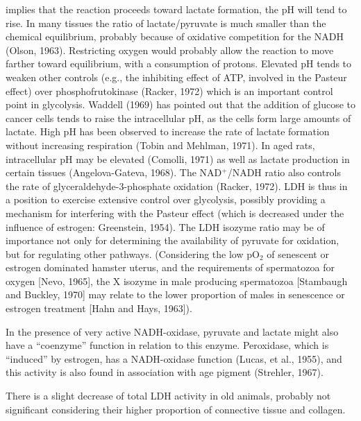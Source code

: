 \noindent implies that the reaction proceeds toward lactate formation, the pH will tend to rise. In many tissues the ratio of lactate/pyruvate is much smaller than the chemical equilibrium, probably because of oxidative competition for the NADH (Olson, 1963). Restricting oxygen would probably allow the reaction to move farther toward equilibrium, with a consumption of protons. Elevated pH tends to weaken other controls (e.g., the inhibiting effect of ATP, involved in the Pasteur effect) over phosphofrutokinase (Racker, 1972) which is an important control point in glycolysis. Waddell (1969) has pointed out that the addition of glucose to cancer cells tends to raise the intracellular pH, as the cells form large amounts of lactate. High pH has been observed to increase the rate of lactate formation without increasing respiration (Tobin and Mehlman, 1971). In aged rats, intracellular pH may be elevated (Comolli, 1971) as well as lactate production in certain tissues (Angelova-Gateva, 1968). The NAD$^{+}$/NADH ratio also controls the rate of glyceraldehyde-3-phosphate oxidation (Racker, 1972). LDH is thus in a position to exercise extensive control over glycolysis, possibly providing a mechanism for interfering with the Pasteur effect (which is decreased under the influence of estrogen: Greenstein, 1954). The LDH isozyme ratio may be of importance not only for determining the availability of pyruvate for oxidation, but for regulating other pathways. (Considering the low pO$_{2}$ of senescent or estrogen dominated hamster uterus, and the requirements of spermatozoa for oxygen [Nevo, 1965], the X isozyme in male producing spermatozoa [Stambaugh and Buckley, 1970] may relate to the lower proportion of males in senescence or estrogen treatment [Hahn and Hays, 1963]).

In the presence of very active NADH-oxidase, pyruvate and lactate might also have a ``coenzyme'' function in relation to this enzyme. Peroxidase, which is ``induced'' by estrogen, has a NADH-oxidase function (Lucas, et al., 1955), and this activity is also found in association with age pigment (Strehler, 1967).

There is a slight decrease of total LDH activity in old animals, probably not significant considering their higher proportion of connective tissue and collagen.

